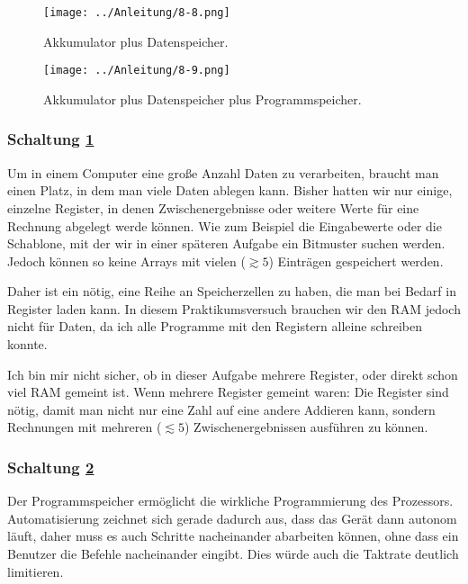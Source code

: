 \begin{figure}[htbp]
	\centering
	\texttt{[image: ../Anleitung/8-8.png]}
	\caption{%
		Akkumulator plus Datenspeicher.
		\cite[Abbildung~8.8]{physik313-Anleitung}
	}
	\label{fig:8-8}
\end{figure}

\begin{figure}[htbp]
	\centering
	\texttt{[image: ../Anleitung/8-9.png]}
	\caption{%
		Akkumulator plus Datenspeicher plus Programmspeicher.
		\cite[Abbildung~8.9]{physik313-Anleitung}
	}
	\label{fig:8-9}
\end{figure}

\subsubsection{Schaltung \ref{fig:8-8}}

Um in einem Computer eine große Anzahl Daten zu verarbeiten, braucht man einen
Platz, in dem man viele Daten ablegen kann. Bisher hatten wir nur einige,
einzelne Register, in denen Zwischenergebnisse oder weitere Werte für eine
Rechnung abgelegt werde können. Wie zum Beispiel die Eingabewerte oder die
Schablone, mit der wir in einer späteren Aufgabe ein Bitmuster suchen werden.
Jedoch können so keine Arrays mit vielen ($\gtrsim 5$) Einträgen gespeichert
werden.

Daher ist ein nötig, eine Reihe an Speicherzellen zu haben, die man bei Bedarf
in Register laden kann. In diesem Praktikumsversuch brauchen wir den RAM jedoch
nicht für Daten, da ich alle Programme mit den Registern alleine schreiben
konnte.

Ich bin mir nicht sicher, ob in dieser Aufgabe mehrere Register, oder direkt
schon viel RAM gemeint ist. Wenn mehrere Register gemeint waren: Die Register
sind nötig, damit man nicht nur eine Zahl auf eine andere Addieren kann,
sondern Rechnungen mit mehreren ($\lesssim 5$) Zwischenergebnissen ausführen zu
können.

\subsubsection{Schaltung \ref{fig:8-9}}

Der Programmspeicher ermöglicht die wirkliche Programmierung des Prozessors.
Automatisierung zeichnet sich gerade dadurch aus, dass das Gerät dann autonom
läuft, daher muss es auch Schritte nacheinander abarbeiten können, ohne dass
ein Benutzer die Befehle nacheinander eingibt. Dies würde auch die Taktrate
deutlich limitieren.

